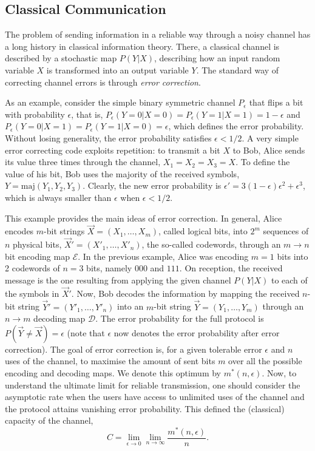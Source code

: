 \documentclass[a4paper]{article}
\begin{document}
\subsection{Classical Communication}

The problem of sending information in a reliable way through a noisy channel has a long history in classical information theory. There, a classical channel is described by a stochastic map $P(Y|X)$, describing how an input random variable $X$ is transformed into an output variable $Y$. The standard way of correcting channel errors is through \emph{error correction}. 

As an example, consider the simple binary symmetric channel $P_\epsilon$ that flips a bit with probability $\epsilon$, that is, $P_\epsilon(Y=0|X=0)=P_\epsilon(Y=1|X=1)=1-\epsilon$ and $P_\epsilon(Y=0|X=1)=P_\epsilon(Y=1|X=0)=\epsilon$, which defines the error probability. Without losing generality, the error probability satisfies $\epsilon<1/2$. A very simple error correcting code exploits repetition: to transmit a bit $X$ to Bob, Alice sends its value three times through the channel, $X_1=X_2=X_3=X$. To define the value of his bit, Bob uses the majority of the received symbols, $Y=\text{maj}(Y_1,Y_2,Y_3)$. Clearly, the new error probability is $\epsilon'=3(1-\epsilon)\epsilon^2+\epsilon^3$, which is always smaller than $\epsilon$ when $\epsilon<1/2$.

This example provides the main ideas of error correction. In general, Alice encodes $m$-bit strings $\vec X=(X_1,\ldots,X_m)$, called logical bits, into $2^m$ sequences of $n$ physical bits, $\vec X'=(X'_1,\ldots,X'_n)$, the so-called codewords, through an $m\rightarrow n$ bit encoding map $\mathcal E$. In the previous example, Alice was encoding $m=1$ bits into 2 codewords of $n=3$ bits, namely $000$ and $111$.  On reception, the received message is the one resulting from applying the given channel $P(Y|X)$ to each of the symbols in $\vec X'$. Now, Bob decodes the information by mapping the received $n$-bit string $\vec Y'=(Y'_1,\ldots,Y'_n)$ into an $m$-bit string $\vec Y=(Y_1,\ldots,Y_m)$ through an $n\rightarrow m$ decoding map $\mathcal D$. The error probability for the full protocol is $P(\vec Y\neq\vec X)=\epsilon$ (note that $\epsilon$ now denotes the error probability after error correction). The goal of error correction is, for a given tolerable error $\epsilon$ and $n$ uses of the channel, to maximise the amount of sent bits $m$ over all the possible encoding and decoding maps. We denote this optimum by $m^*(n,\epsilon)$. Now, to understand the ultimate limit for reliable transmission, one should consider the asymptotic rate when the users have access to unlimited uses of the channel and the protocol attains vanishing error probability. This defined the (classical) capacity of the channel, 
\begin{equation}
\label{capacity}
C=\lim_{\epsilon\rightarrow 0} \lim_{n\rightarrow \infty}\frac{m^*(n,\epsilon)}{n} .
\end{equation}
\end{document}
